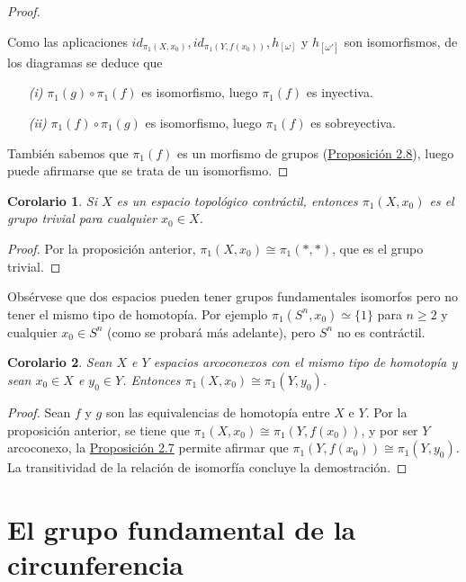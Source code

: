 \documentclass[11pt]{report}
\newtheorem{corollary}{Corolario}[chapter]
\theoremstyle{definition}
\theoremstyle{definition}
\theoremstyle{remark}
\begin{document}
\begin{proof}
\begin{center}
\end{center}
Como las aplicaciones $id_{\pi_1(X,x_0)}, id_{\pi_1(Y,f(x_0))}, h_{[\omega]}$ y $h_{[\omega']}$ son isomorfismos, de los diagramas se deduce que 
\begin{itemize}
    \item[\textit{(i)}] $\pi_1(g) \circ \pi_1(f)$ es isomorfismo, luego $\pi_1(f)$ es inyectiva.
    \item[\textit{(ii)}] $\pi_1(f) \circ \pi_1(g)$ es isomorfismo, luego $\pi_1(f)$ es sobreyectiva.
\end{itemize}
También sabemos que $\pi_1(f)$ es un morfismo de grupos (\hyperref[prop2.8.]{\color{blue}Proposición 2.8}), luego puede afirmarse que se trata de un isomorfismo.
\end{proof}

\begin{corollary}
\label{cor2.3.}
Si $X$ es un espacio topológico contráctil, entonces $\pi_1(X,x_0)$ es el grupo trivial para cualquier $x_0 \in X$.
\end{corollary}

\begin{proof}
Por la proposición anterior, $\pi_1(X,x_0) \cong \pi_1(\ast, \ast)$, que es el grupo trivial.
\end{proof}

Obsérvese que dos espacios pueden tener grupos fundamentales isomorfos pero no tener el mismo tipo de homotopía. Por ejemplo $\pi_1(S^n,x_0) \simeq \{1\}$ para $n \geq 2$ y cualquier $x_0 \in S^n$ (como se probará más adelante), pero $S^n$ no es contráctil.

\begin{corollary}
Sean $X$ e $Y$ espacios arcoconexos con el mismo tipo de homotopía y sean $x_0 \in X$ e $y_0 \in Y$. Entonces $\pi_1(X,x_0) \cong \pi_1(Y,y_0)$.
\end{corollary}

\begin{proof}
Sean $f$ y $g$ son las equivalencias de homotopía entre $X$ e $Y$. Por la proposición anterior, se tiene que $\pi_1(X,x_0) \cong \pi_1(Y,f(x_0))$, y por ser $Y$ arcoconexo, la \hyperref[prop2.7.]{\color{blue}Proposición 2.7} permite afirmar que $\pi_1(Y,f(x_0)) \cong \pi_1(Y,y_0)$. La transitividad de la relación de isomorfía concluye la demostración.
\end{proof}

\section{El grupo fundamental de la circunferencia}
\end{document}
